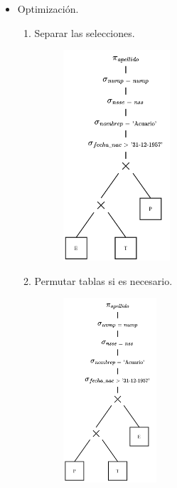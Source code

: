 \documentclass{templateNote}
\begin{document}
\begin{itemize}
    \item Optimizaci\'on.
    \begin{enumerate}
        \item Separar las selecciones.
        \begin{figure}[H]
            \centering
            \includegraphics[width=0.4\textwidth]{img/E5-Paso-1.png}
        \end{figure}

        \newpage
        \item Permutar tablas si es necesario.
        \begin{figure}[H]
            \centering
            \includegraphics[width=0.35\textwidth]{img/E5-Paso-2.png}
        \end{figure}


\end{enumerate}
\end{itemize}
\end{document}
